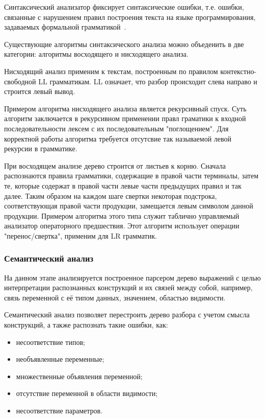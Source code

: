 Синтаксический анализатор фиксирует синтаксические ошибки, т.е. ошибки, связанные с нарушением правил построения
текста на языке программирования, задаваемых формальной грамматикой~\cite{aho_syntax}.

Существующие алгоритмы синтаксического анализа можно объеденить в две категории: алгоритмы восходящего и нисходящего анализа.

Нисходящий анализ применим к текстам, построенным по правилом контекстно-свободной LL грамматикам. LL означает, что
разбор происходит слева направо и строится левый вывод.

Примером алгоритма нисходящего анализа является рекурсивный спуск. Суть алгоритм заключается в рекурсивном применении
правл граматики к входной последовательности лексем с их последовательным "поглощением". Для корректной работы алгоритма
требуется отсутсвие так называемой левой рекурсии в грамматике.

При восходящем анализе дерево строится от листьев к корню. Сначала распознаются правила грамматики, содержащие в правой
части терминалы, затем те, которые содержат в правой части левые части предыдущих правил и так далее.
Таким образом на каждом шаге свертки некоторая подстрока, соответствующая правой части продукции, замещается левым символом данной продукции.
Примером алгоритма этого типа служит таблично управляемый анализатор операторного предшествия.
Этот алгоритм использует операции "перенос/свертка", применим для LR грамматик.

\subsubsection{Семантический анализ}\label{subsubsec:semantic_analyz}
На данном этапе анализируется построенное парсером дерево выражений с целью интерпретации распознанных конструкций
и их связей между собой, например, связь переменной с её типом данных, значением, областью видимости.

Семантический анализ позволяет перестроить дерево разбора с учетом смысла конструкций, а также распознать такие ошибки, как:
\begin{itemize}
    \item несоответствие типов;
    \item необъявленные переменные;
    \item множественные объявления переменной;
    \item отсутствие переменной в области видимости;
    \item несоответствие параметров.
\end{itemize}

